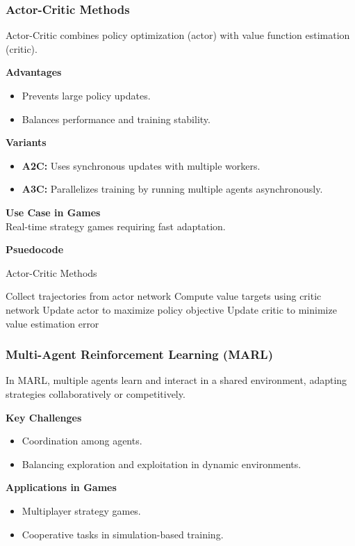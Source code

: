 \documentclass[12pt,oneside,openright,a4paper]{cpe-english-project}
\begin{document}
\subsubsection{Actor-Critic Methods}
Actor-Critic combines policy optimization (actor) with value function estimation (critic).\par
\textbf{Advantages} 
\begin{itemize}
\item Prevents large policy updates.
\item Balances performance and training stability.
\end{itemize}
\textbf{Variants}
\begin{itemize}
\item  \textbf{A2C:} Uses synchronous updates with multiple workers.
\item  \textbf{A3C:} Parallelizes training by running multiple agents asynchronously.
\end{itemize}
\textbf{Use Case in Games} \\
Real-time strategy games requiring fast adaptation.\par
\textbf{Psuedocode}
\begin{algorithm}
\caption{Actor-Critic Methods}\label{alg:ACM}
\begin{algorithmic}
\State Collect trajectories from actor network
\State Compute value targets using critic network
\State Update actor to maximize policy objective
\State Update critic to minimize value estimation error
\EndFor
\end{algorithmic}
\end{algorithm}
\subsubsection{Multi-Agent Reinforcement Learning (MARL)}
In MARL, multiple agents learn and interact in a shared environment, adapting strategies collaboratively or competitively.\par
\textbf{Key Challenges} 
\begin{itemize}
\item Coordination among agents.
\item Balancing exploration and exploitation in dynamic environments.
\end{itemize}
\textbf{Applications in Games}
\begin{itemize}
\item Multiplayer strategy games.
\item Cooperative tasks in simulation-based training.
\end{itemize}
\end{document}
